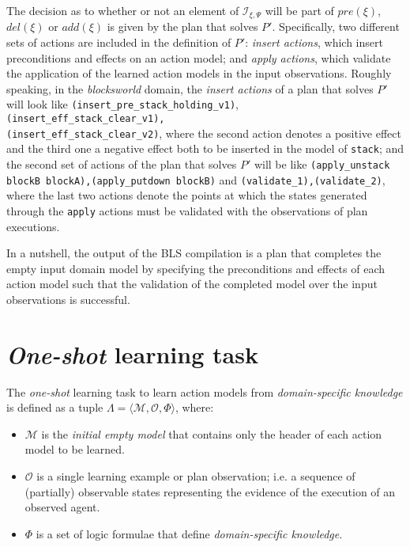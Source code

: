 \documentclass{article}
\newcommand{\tup}[1]{{\langle #1 \rangle}}
\begin{document}
The decision as to whether or not an element of ${\mathcal I}_{\xi,\Psi}$ will be part of $pre(\xi)$, $del(\xi)$ or $add(\xi)$ is given by the plan that solves $P'$. Specifically, two different sets of actions are included in the definition of $P'$: \emph{insert actions}, which insert preconditions and effects on an action model; and \emph{apply actions}, which validate the application of the learned action models in the input observations. Roughly speaking, in the \emph{blocksworld} domain, the \emph{insert actions} of a plan that solves $P'$ will look like {\tt{\footnotesize(insert\_pre\_stack\_holding\_v1)}},\\
{\tt{\footnotesize(insert\_eff\_stack\_clear\_v1),\\
(insert\_eff\_stack\_clear\_v2)}}, where the second action denotes a positive effect and the third one a negative effect both to be inserted in the model of {\tt{\small stack}}; and the second set of actions of the plan that solves $P'$ will be like {\tt{\small (apply\_unstack blockB blockA),(apply\_putdown blockB)}} and {\tt{\small (validate\_1),(validate\_2)}}, where the last two actions denote the points at which the states generated through the {\tt {\small apply}} actions must be validated with the observations of plan executions.

In a nutshell, the output of the BLS compilation is a plan that completes the empty input domain model by specifying the preconditions and effects of each action model such that the validation of the completed model over the input observations is successful.





\section{{\em One-shot} learning task}
\label{sec:learning}

The {\em one-shot} learning task to learn action models from {\em domain-specific knowledge} is defined as a tuple $\Lambda=\tup{\mathcal{M},{\mathcal O},\Phi}$, where:

\begin{itemize}
\item $\mathcal{M}$ is the {\em initial empty model} that contains only the header of each action model to be learned.
\item $\mathcal{O}$ is a single learning example or plan observation; i.e. a sequence of (partially) observable states representing the evidence of the execution of an observed agent.
\item $\Phi$ is a set of logic formulae that define {\em domain-specific knowledge}.
\end{itemize}
\end{document}
